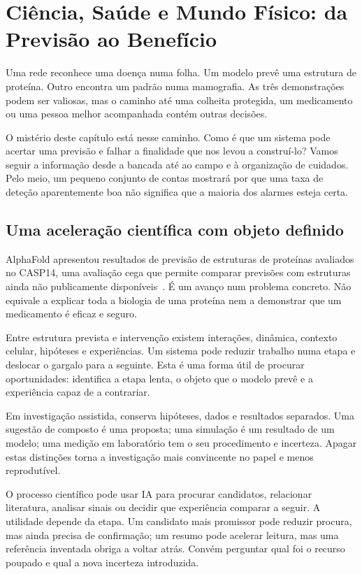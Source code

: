 \chapter{Ciência, Saúde e Mundo Físico: da Previsão ao Benefício}
\label{ch:ciencia}

Uma rede reconhece uma doença numa folha. Um modelo prevê uma estrutura de proteína. Outro encontra um padrão numa mamografia. As três demonstrações podem ser valiosas, mas o caminho até uma colheita protegida, um medicamento ou uma pessoa melhor acompanhada contém outras decisões.

O mistério deste capítulo está nesse caminho. Como é que um sistema pode acertar uma previsão e falhar a finalidade que nos levou a construí-lo? Vamos seguir a informação desde a bancada até ao campo e à organização de cuidados. Pelo meio, um pequeno conjunto de contas mostrará por que uma taxa de deteção aparentemente boa não significa que a maioria dos alarmes esteja certa.

\section{Uma aceleração científica com objeto definido}
AlphaFold apresentou resultados de previsão de estruturas de proteínas avaliados no CASP14, uma avaliação cega que permite comparar previsões com estruturas ainda não publicamente disponíveis~\citep{jumper2021}. É um avanço num problema concreto. Não equivale a explicar toda a biologia de uma proteína nem a demonstrar que um medicamento é eficaz e seguro.

Entre estrutura prevista e intervenção existem interações, dinâmica, contexto celular, hipóteses e experiências. Um sistema pode reduzir trabalho numa etapa e deslocar o gargalo para a seguinte. Esta é uma forma útil de procurar oportunidades: identifica a etapa lenta, o objeto que o modelo prevê e a experiência capaz de a contrariar.

Em investigação assistida, conserva hipóteses, dados e resultados separados. Uma sugestão de composto é uma proposta; uma simulação é um resultado de um modelo; uma medição em laboratório tem o seu procedimento e incerteza. Apagar estas distinções torna a investigação mais convincente no papel e menos reprodutível.

O processo científico pode usar IA para procurar candidatos, relacionar literatura, analisar sinais ou decidir que experiência comparar a seguir. A utilidade depende da etapa. Um candidato mais promissor pode reduzir procura, mas ainda precisa de confirmação; um resumo pode acelerar leitura, mas uma referência inventada obriga a voltar atrás. Convém perguntar qual foi o recurso poupado e qual a nova incerteza introduzida.

